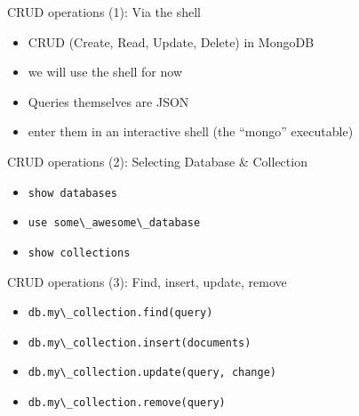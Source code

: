 \begin{frame}{CRUD operations (1): Via the shell}
  \begin{itemize}
      \item CRUD (Create, Read, Update, Delete) in MongoDB
      \item we will use the shell for now
      \item Queries themselves are JSON
      \item enter them in an interactive shell (the ``mongo'' executable)
  \end{itemize}
\end{frame}

\begin{frame}[fragile]{CRUD operations (2): Selecting Database \& Collection}
  \begin{itemize}
    \item \lstinline[basicstyle=\ttfamily]{show databases}
    \item \lstinline[basicstyle=\ttfamily]{use some\_awesome\_database}
    \item \lstinline[basicstyle=\ttfamily]{show collections}
  \end{itemize}
\end{frame}

\begin{frame}[fragile]{CRUD operations (3): Find, insert, update, remove}
  \begin{itemize}
    \item \lstinline[basicstyle=\ttfamily]{db.my\_collection.find(query)}
    \item \lstinline[basicstyle=\ttfamily]{db.my\_collection.insert(documents)}
    \item \lstinline[basicstyle=\ttfamily]{db.my\_collection.update(query, change)}
    \item \lstinline[basicstyle=\ttfamily]{db.my\_collection.remove(query)}
  \end{itemize}
\end{frame}

